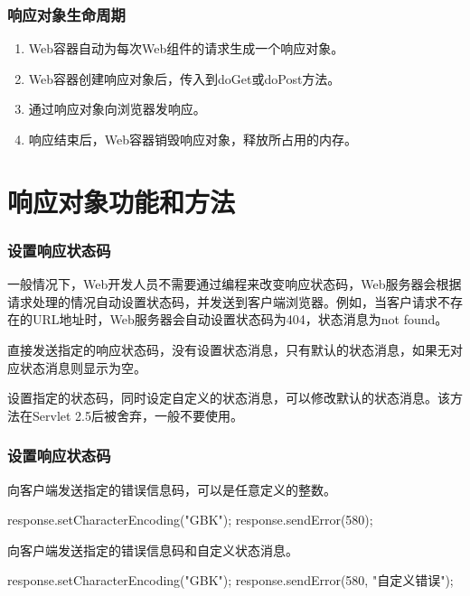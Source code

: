 \begin{frame}[fragile] %
\frametitle{响应对象生命周期} 

\begin{enumerate}
\item Web容器自动为每次Web组件的请求生成一个响应对象。
\item Web容器创建响应对象后，传入到doGet或doPost方法。
\item 通过响应对象向浏览器发响应。
\item 响应结束后，Web容器销毁响应对象，释放所占用的内存。
\end{enumerate}

\end{frame}

\section{响应对象功能和方法}

\begin{frame}[fragile] %
\frametitle{设置响应状态码} 

一般情况下，Web开发人员不需要通过编程来改变响应状态码，Web服务器会根据请求处理的情况自动设置状态码，并发送到客户端浏览器。例如，当客户请求不存在的URL地址时，Web服务器会自动设置状态码为404，状态消息为not found。


直接发送指定的响应状态码，没有设置状态消息，只有默认的状态消息，如果无对应状态消息则显示为空。


设置指定的状态码，同时设定自定义的状态消息，可以修改默认的状态消息。该方法在Servlet 2.5后被舍弃，一般不要使用。

\end{frame}

\begin{frame}[fragile] %
\frametitle{设置响应状态码} 


向客户端发送指定的错误信息码，可以是任意定义的整数。

\begin{javaCode}
response.setCharacterEncoding("GBK");
response.sendError(580); 
\end{javaCode}


向客户端发送指定的错误信息码和自定义状态消息。

\begin{javaCode}
response.setCharacterEncoding("GBK");
response.sendError(580, "自定义错误"); 
\end{javaCode}
\end{frame}

